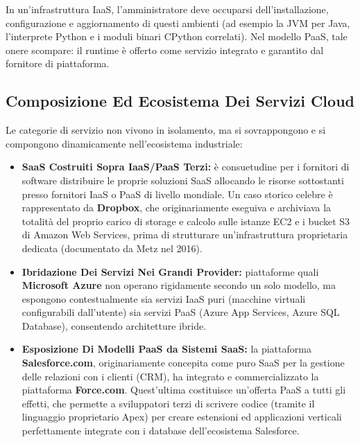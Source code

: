 \documentclass[11pt, a4paper]{article}
\begin{document}
In un'infrastruttura IaaS, l'amministratore deve occuparsi dell'installazione, configurazione e aggiornamento di questi ambienti (ad esempio la JVM per Java, l'interprete Python e i moduli binari CPython correlati). Nel modello PaaS, tale onere scompare: il runtime è offerto come servizio integrato e garantito dal fornitore di piattaforma.

\subsection{Composizione Ed Ecosistema Dei Servizi Cloud}

Le categorie di servizio non vivono in isolamento, ma si sovrappongono e si compongono dinamicamente nell'ecosistema industriale:

\begin{itemize}
    \item \textbf{SaaS Costruiti Sopra IaaS/PaaS Terzi:} è consuetudine per i fornitori di software distribuire le proprie soluzioni SaaS allocando le risorse sottostanti presso fornitori IaaS o PaaS di livello mondiale. Un caso storico celebre è rappresentato da \textbf{Dropbox}, che originariamente eseguiva e archiviava la totalità del proprio carico di storage e calcolo sulle istanze EC2 e i bucket S3 di Amazon Web Services, prima di strutturare un'infrastruttura proprietaria dedicata (documentato da Metz nel 2016).
    \item \textbf{Ibridazione Dei Servizi Nei Grandi Provider:} piattaforme quali \textbf{Microsoft Azure} non operano rigidamente secondo un solo modello, ma espongono contestualmente sia servizi IaaS puri (macchine virtuali configurabili dall'utente) sia servizi PaaS (Azure App Services, Azure SQL Database), consentendo architetture ibride.
    \item \textbf{Esposizione Di Modelli PaaS da Sistemi SaaS:} la piattaforma \textbf{Salesforce.com}, originariamente concepita come puro SaaS per la gestione delle relazioni con i clienti (CRM), ha integrato e commercializzato la piattaforma \textbf{Force.com}. Quest'ultima costituisce un'offerta PaaS a tutti gli effetti, che permette a sviluppatori terzi di scrivere codice (tramite il linguaggio proprietario Apex) per creare estensioni ed applicazioni verticali perfettamente integrate con i database dell'ecosistema Salesforce.
\end{itemize}

\end{document}
